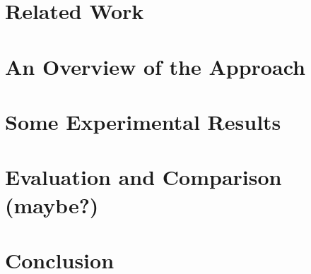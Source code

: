 \documentclass[english]{llncs}
\begin{document}
\section{Related Work}
\label{section:relatedwork}


\section{An Overview of the Approach}
\label{section:approach}


\section{Some Experimental Results}
\label{section:results}


\section{Evaluation and Comparison (maybe?)}
\label{section:evaluation-comparison}


\section{Conclusion}
\label{section:conclusion}


\begin{acronym}[ICP]
\end{acronym}
\end{document}

